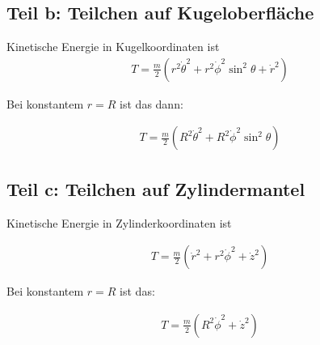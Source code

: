 \documentclass[a4paper,german,12pt,smallheadings]{scrartcl}
\begin{document}
\subsection*{Teil b: Teilchen auf Kugeloberfläche}

Kinetische Energie in Kugelkoordinaten ist
\begin{align*}
  T = \frac{m}{2} (r^2 \dot{\theta}^2 + r^2 \dot{\phi}^2 \sin^2 \theta + \dot{r}^2)
\end{align*}

Bei konstantem $r = R$ ist das dann:

\begin{align*}
  T = \frac{m}{2} (R^2 \dot{\theta}^2 + R^2 \dot{\phi}^2 \sin^2 \theta)
\end{align*}


\subsection*{Teil c: Teilchen auf Zylindermantel}

Kinetische Energie in Zylinderkoordinaten ist

\begin{align*}
  T = \frac{m}{2} (\dot{r}^2 + r^2\dot{\phi}^2 + \dot{z}^2)
\end{align*}

Bei konstantem $r = R$ ist das:

\begin{align*}
  T = \frac{m}{2} (R^2\dot{\phi}^2 + \dot{z}^2)
\end{align*}
\end{document}

